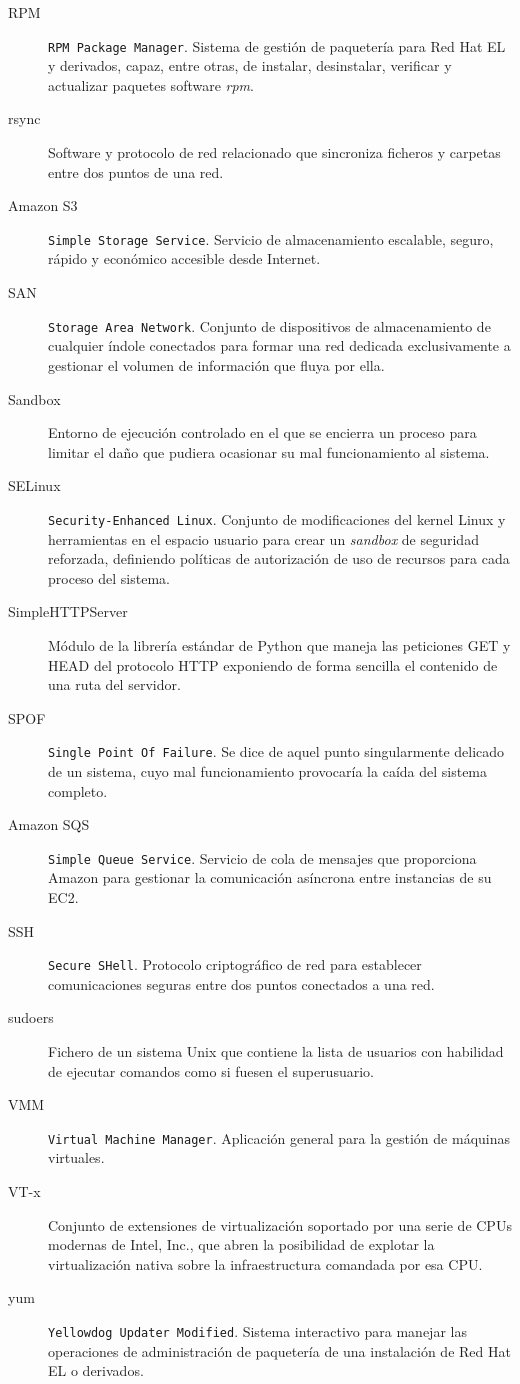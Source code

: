 \begin{description}
\item[RPM] \texttt{RPM Package Manager}. Sistema de gesti\'on de paqueter\'ia para Red Hat EL y derivados, capaz, entre otras, de instalar, desinstalar, verificar y actualizar paquetes software \emph{rpm}.
\item[rsync] Software y protocolo de red relacionado que sincroniza ficheros y carpetas entre dos puntos de una red.
\item[Amazon S3] \texttt{Simple Storage Service}. Servicio de almacenamiento es\-ca\-la\-ble, seguro, r\'apido y econ\'omico accesible desde Internet.
\item[SAN] \texttt{Storage Area Network}. Conjunto de dispositivos de almacenamiento de cualquier \'indole conectados para formar una red dedicada exclusivamente a gestionar el volumen de informaci\'on que fluya por ella.
\item[Sandbox] Entorno de ejecuci\'on controlado en el que se encierra un proceso para limitar el da\~no que pudiera ocasionar su mal funcionamiento al sistema.
\item[SELinux] \texttt{Security-Enhanced Linux}. Conjunto de modificaciones del kernel Linux y herramientas en el espacio usuario para crear un \emph{sandbox} de seguridad reforzada, definiendo pol\'iticas de autorizaci\'on de uso de recursos para cada proceso del sistema.
\item[SimpleHTTPServer] M\'odulo de la librer\'ia est\'andar de Python que maneja las peticiones GET y HEAD del protocolo HTTP exponiendo de forma sencilla el contenido de una ruta del servidor.
\item[SPOF] \texttt{Single Point Of Failure}. Se dice de aquel punto singularmente delicado de un sistema, cuyo mal funcionamiento provocar\'ia la ca\'ida del sistema completo.
\item[Amazon SQS] \texttt{Simple Queue Service}. Servicio de cola de mensajes que proporciona Amazon para gestionar la comunicaci\'on as\'incrona entre instancias de su EC2.
\item[SSH] \texttt{Secure SHell}. Protocolo criptogr\'afico de red para establecer comunicaciones seguras entre dos puntos conectados a una red.
\item[sudoers] Fichero de un sistema Unix que contiene la lista de usuarios con habilidad de ejecutar comandos como si fuesen el superusuario.
\item[VMM] \texttt{Virtual Machine Manager}. Aplicaci\'on general para la gesti\'on de m\'aquinas virtuales.
\item[VT-x] Conjunto de extensiones de virtualizaci\'on soportado por una serie de CPUs modernas de Intel, Inc., que abren la posibilidad de explotar la virtualizaci\'on nativa sobre la infraestructura comandada por esa CPU.
\item[yum] \texttt{Yellowdog Updater Modified}. Sistema interactivo para manejar las operaciones de administraci\'on de paqueter\'ia de una instalaci\'on de Red Hat EL o derivados.
\end{description}

